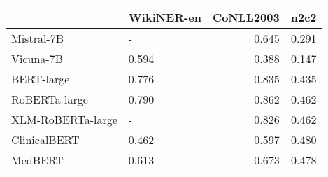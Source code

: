 \begin{tabular}{llrr}
\toprule
 & WikiNER-en & CoNLL2003 & n2c2 \\
\midrule
Mistral-7B & - & 0.645 & 0.291 \\
Vicuna-7B & 0.594 & 0.388 & 0.147 \\
BERT-large & 0.776 & 0.835 & 0.435 \\
RoBERTa-large & 0.790 & 0.862 & 0.462 \\
XLM-RoBERTa-large & - & 0.826 & 0.462 \\
ClinicalBERT & 0.462 & 0.597 & 0.480 \\
MedBERT & 0.613 & 0.673 & 0.478 \\
\bottomrule
\end{tabular}
